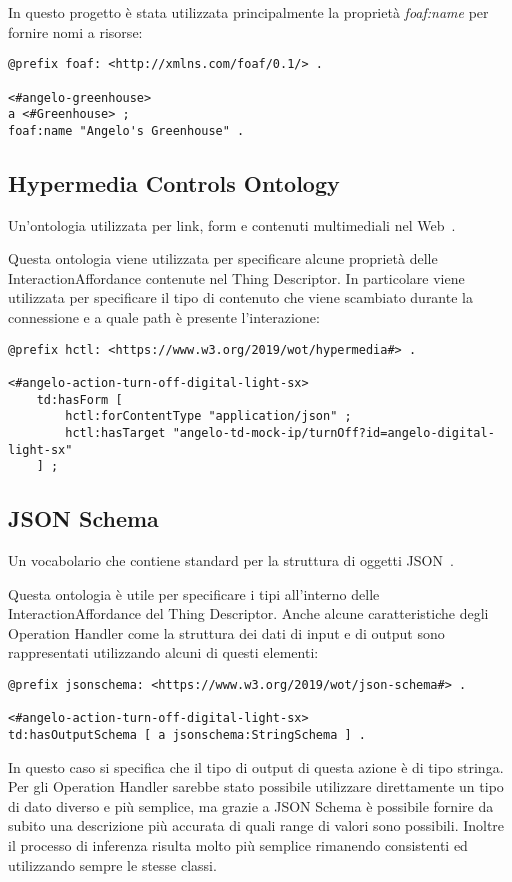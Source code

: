 \noindent In questo progetto è stata utilizzata principalmente la proprietà \textit{foaf:name} per fornire nomi a risorse:
\begin{verbatim}
@prefix foaf: <http://xmlns.com/foaf/0.1/> .

<#angelo-greenhouse>
a <#Greenhouse> ;
foaf:name "Angelo's Greenhouse" .
\end{verbatim}

\subsection{Hypermedia Controls Ontology}
Un'ontologia utilizzata per link, form e contenuti multimediali nel Web~\cite{Hypermed84:online}.

\noindent Questa ontologia viene utilizzata per specificare alcune proprietà delle InteractionAffordance contenute nel Thing Descriptor. In particolare viene utilizzata per specificare il tipo di contenuto che viene scambiato durante la connessione e a quale path è presente l'interazione:
\begin{verbatim}
@prefix hctl: <https://www.w3.org/2019/wot/hypermedia#> .

<#angelo-action-turn-off-digital-light-sx>
	td:hasForm [
		hctl:forContentType "application/json" ;
		hctl:hasTarget "angelo-td-mock-ip/turnOff?id=angelo-digital-light-sx"
	] ;
\end{verbatim}

\subsection{JSON Schema}
Un vocabolario che contiene standard per la struttura di oggetti JSON~\cite{JSONSche6:online}.

Questa ontologia è utile per specificare i tipi all'interno delle InteractionAffordance del Thing Descriptor.\newline
\noindent Anche alcune caratteristiche degli Operation Handler come la struttura dei dati di input e di output sono rappresentati utilizzando alcuni di questi elementi:
\begin{verbatim}
@prefix jsonschema: <https://www.w3.org/2019/wot/json-schema#> .

<#angelo-action-turn-off-digital-light-sx>
td:hasOutputSchema [ a jsonschema:StringSchema ] .
\end{verbatim}
\noindent In questo caso si specifica che il tipo di output di questa azione è di tipo stringa.\newline
\noindent Per gli Operation Handler sarebbe stato possibile utilizzare direttamente un tipo di dato diverso e più semplice, ma grazie a JSON Schema è possibile fornire da subito una descrizione più accurata di quali range di valori sono possibili.\newline
\noindent Inoltre il processo di inferenza risulta molto più semplice rimanendo consistenti ed utilizzando sempre le stesse classi.\newline


